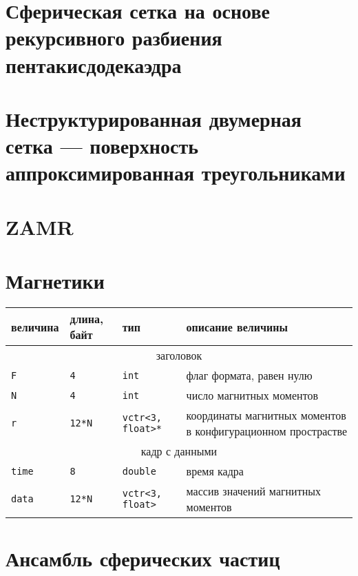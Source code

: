 \documentclass[12pt]{article}
\begin{document}
\section{Сферическая сетка на основе рекурсивного разбиения пентакисдодекаэдра}
\section{Неструктурированная двумерная сетка --- поверхность аппроксимированная треугольниками}
\section{ZAMR}
\section{Магнетики}
\begin{center}
\begin{tabular}{|p{}|p{}|p{}|p{}|}
\hline
величина & длина, байт & тип & описание величины \\
\hline
\multicolumn{4}{|c|}{заголовок \rule{0pt}{.6cm}}\\
\hline
{\tt F} & {\tt 4} & {\tt int} & флаг формата, равен нулю \\
{\tt N} & {\tt 4} & {\tt int} & число магнитных моментов \\
{\tt r} & {\tt 12*N} & {\tt vctr<3, float>*} & координаты магнитных моментов в конфигурационном прострастве\\
\hline
\multicolumn{4}{|c|}{кадр с данными \rule{0pt}{.6cm}}\\
\hline
{\tt time} & {\tt 8} & {\tt double} & время кадра \\
{\tt data} & {\tt 12*N} & {\tt vctr<3, float>} & массив значений магнитных моментов \\
\hline
\end{tabular}
\end{center}

\section{Ансамбль сферических частиц}
\end{document}
